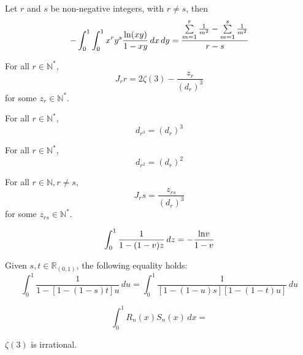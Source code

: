 \begin{lemma}\label{J_rs}
    Let $r$ and $s$ be non-negative integers, with $r \neq s$, then
    \[ -\int_{0}^{1}\int_{0}^{1} x^ry^s\frac{{\rm ln}(xy)}{1-xy} \, dx \, dy = \frac{\sum\limits_{m = 1}^{r}\frac{1}{m^2} - \sum\limits_{m = 1}^{s}\frac{1}{m^2}}{r - s} \]
\end{lemma}

\begin{lemma}\label{Jrr_linear_form}
    For all $r \in \mathbb{N}^*$,
    \[ J_rr = 2 \zeta(3) - \frac{z_r}{(d_r)^3} \]
    for some $z_r \in \mathbb{N}^*$.
\end{lemma}

\begin{lemma}\label{d_r_3}
    For all $r \in \mathbb{N}^*$,
    \[ d_{r^3} = (d_r)^3 \]
\end{lemma}

\begin{lemma}\label{d_r_2}
    For all $r \in \mathbb{N}^*$,
    \[ d_{r^2} = (d_r)^2 \]
\end{lemma}

\begin{lemma}\label{Jrs_postive_rational}
    For all $r \in \mathbb{N}, r \neq s$,
    \[ J_rs = \frac{z_{rs}}{(d_r)^3}\]
    for some $z_{rs} \in \mathbb{N}^*$.
\end{lemma}

\begin{lemma}\label{one_var_substitution}
    \[ \int_{0}^{1} \frac{1}{1 - (1 - v)z} \, dz= -\frac{{\rm ln}v}{1 - v} \]
\end{lemma}

\begin{lemma}\label{two_var_substitution}
    Given $s, t \in \mathbb{R}_{(0,1)}$, the following equality holds:
    \[ \int_{0}^{1} \frac{1}{1 - [1 - (1 - s)t]u} \, du = \int_{0}^{1} \frac{1}{[1 - (1 - u)s][1 - (1 - t)u]} \, du \]
\end{lemma}

\begin{lemma}
    \[ \int_{0}^{1} R_n(x)S_n(x) \, dx = \]
\end{lemma} 

\begin{theorem}\label{zeta_3_irrational}
    $\zeta(3)$ is irrational.
\end{theorem}